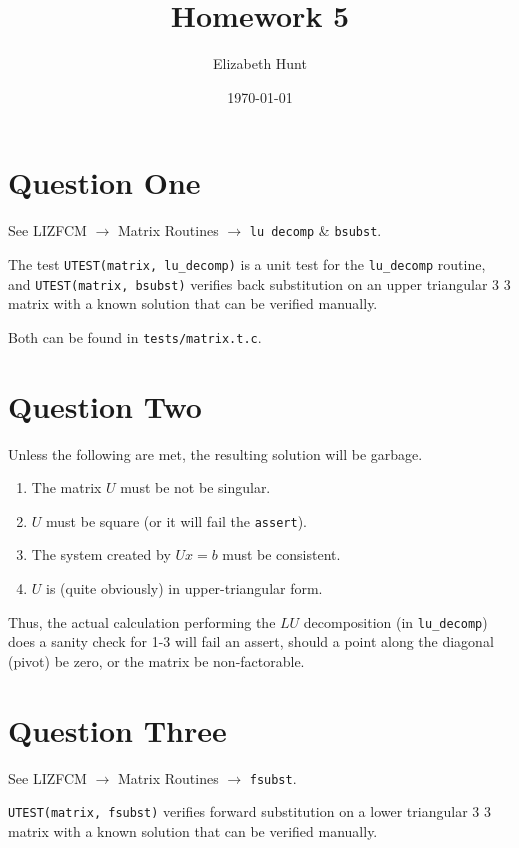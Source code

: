 \documentclass[11pt]{article}
\author{Elizabeth Hunt}
\date{\today}
\title{Homework 5}
\begin{document}
\maketitle
\setlength\parindent{0pt}

\section{Question One}
\label{sec:org4e80298}
See LIZFCM \(\rightarrow\) Matrix Routines \(\rightarrow\) \texttt{lu decomp} \& \texttt{bsubst}.

The test \texttt{UTEST(matrix, lu\_decomp)} is a unit test for the \texttt{lu\_decomp} routine,
and \texttt{UTEST(matrix, bsubst)} verifies back substitution on an upper triangular
3 \texttimes{} 3 matrix with a known solution that can be verified manually.

Both can be found in \texttt{tests/matrix.t.c}.

\section{Question Two}
\label{sec:orga73d05c}
Unless the following are met, the resulting solution will be garbage.

\begin{enumerate}
\item The matrix \(U\) must be not be singular.
\item \(U\) must be square (or it will fail the \texttt{assert}).
\item The system created by \(Ux = b\) must be consistent.
\item \(U\) is (quite obviously) in upper-triangular form.
\end{enumerate}

Thus, the actual calculation performing the \(LU\) decomposition
(in \texttt{lu\_decomp}) does a sanity
check for 1-3 will fail an assert, should a point along the diagonal (pivot) be
zero, or the matrix be non-factorable.

\section{Question Three}
\label{sec:org35163c5}
See LIZFCM \(\rightarrow\) Matrix Routines \(\rightarrow\) \texttt{fsubst}.

\texttt{UTEST(matrix, fsubst)} verifies forward substitution on a lower triangular 3 \texttimes{} 3
matrix with a known solution that can be verified manually.
\end{document}
